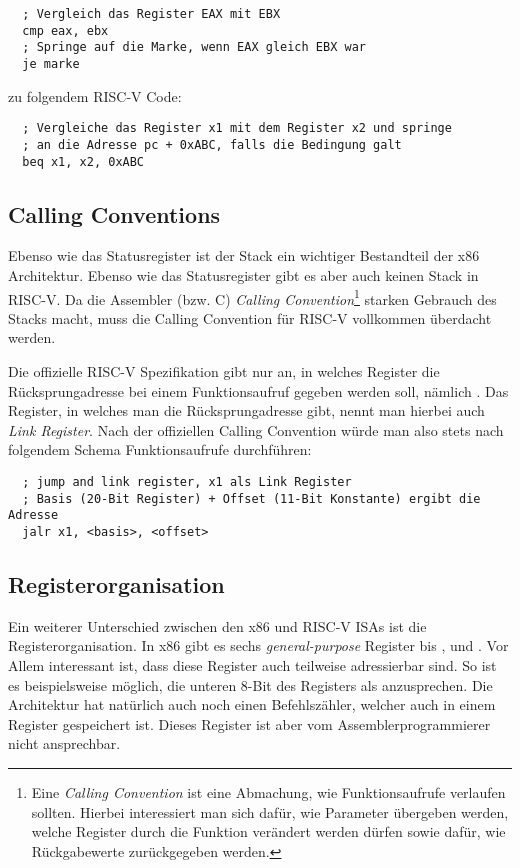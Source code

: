 \begin{lstlisting}
  ; Vergleich das Register EAX mit EBX
  cmp eax, ebx
  ; Springe auf die Marke, wenn EAX gleich EBX war
  je marke
\end{lstlisting}

zu folgendem RISC-V Code:

\begin{lstlisting}
  ; Vergleiche das Register x1 mit dem Register x2 und springe
  ; an die Adresse pc + 0xABC, falls die Bedingung galt
  beq x1, x2, 0xABC
\end{lstlisting}

\subsection{Calling Conventions}

Ebenso wie das Statusregister ist der Stack ein wichtiger Bestandteil der x86
Architektur. Ebenso wie das Statusregister gibt es aber auch keinen Stack in
RISC-V. Da die Assembler (bzw. C) \emph{Calling Convention}\footnote{Eine
  \emph{Calling Convention} ist eine Abmachung, wie Funktionsaufrufe verlaufen
  sollten. Hierbei interessiert man sich dafür, wie Parameter übergeben werden,
  welche Register durch die Funktion verändert werden dürfen sowie dafür, wie
  Rückgabewerte zurückgegeben werden.} starken Gebrauch des Stacks macht, muss
die Calling Convention für RISC-V vollkommen überdacht werden.

Die offizielle RISC-V Spezifikation gibt nur an, in welches Register die
Rücksprungadresse bei einem Funktionsaufruf gegeben werden soll, nämlich
. Das Register, in welches man die Rücksprungadresse gibt, nennt man
hierbei auch \emph{Link Register}. Nach der offiziellen Calling Convention würde
man also stets nach folgendem Schema Funktionsaufrufe durchführen:

\begin{lstlisting}
  ; jump and link register, x1 als Link Register
  ; Basis (20-Bit Register) + Offset (11-Bit Konstante) ergibt die Adresse
  jalr x1, <basis>, <offset>
\end{lstlisting}

\subsection{Registerorganisation}

Ein weiterer Unterschied zwischen den x86 und RISC-V ISAs ist die
Registerorganisation. In x86 gibt es sechs \emph{general-purpose} Register
 bis ,  und . Vor Allem interessant ist,
dass diese Register auch teilweise adressierbar sind. So ist es beispielsweise
möglich, die unteren 8-Bit des Registers  als 
anzusprechen. Die Architektur hat natürlich auch noch einen Befehlszähler,
welcher auch in einem Register gespeichert ist. Dieses Register ist aber vom
Assemblerprogrammierer nicht ansprechbar.

